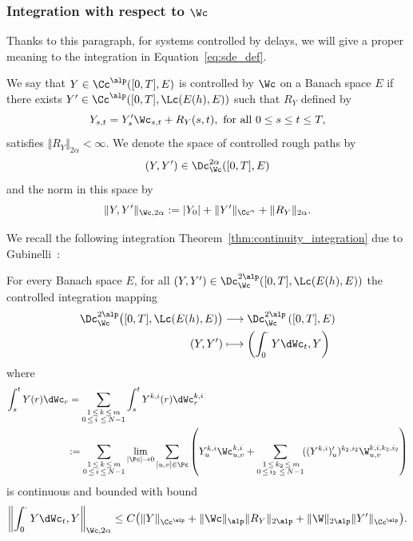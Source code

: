 \subsubsection{Integration with respect to \texorpdfstring{$\Wc$}{W}}
Thanks to this paragraph, for systems controlled by delays, we will give a proper meaning to the integration in Equation~\eqref{eq:sde_def}.

\begin{defi}\label{def-controlled}
We say that $Y\in \Cc^\alp ([0,T], E)$ is controlled by $\Wc$ on a Banach space $E$ if there exists $Y'\in \Cc^\alp ([0,T], \Lc(E(h),E))$ such that $R_Y$ defined by
\begin{equation}\label{controlled}
Y_{s,t}= Y'_s \Wc_{s,t} + R_Y(s,t),\text{ for all }0\leq s\leq t\leq T,
\end{equation}
satisfies $\Vert R_Y \Vert_{2\alpha}<\infty$. We denote the space of controlled rough paths by
\[
(Y,Y')\in \Dc_\Wc^{2\alpha} ([0,T], E)
\]
and the norm in this space by
\[
\Vert Y,Y'\Vert_{\Wc,2\alpha}:=|Y_0|+\Vert Y'\Vert_{\Cc^\alpha}+ \Vert R_Y\Vert_{2\alpha}.
\]
\end{defi}

We recall the following integration Theorem~\ref{thm:continuity_integration} due to Gubinelli~\cite[Theorem~4.10]{FH14}:
\begin{theo}\label{thm:continuity_integration}
For every Banach space $E$, for all $(Y,Y')\in \Dc_{\Wc}^{2\alp} ([0,T], \Lc(E(h),\linebreak E))$ the controlled integration mapping
\begin{align*}
\Dc_{\Wc}^{2\alp} \big([0,T], \Lc(E(h),E) \big)  &\longrightarrow\Dc_{\Wc}^{2\alp} \left([0,T], E \right)\\
(Y,Y')&\longmapsto\left(\int_0^\cdot Y\dWc_t,Y\right)
\end{align*}
where
\begin{align*}
\int_s^t Y(r) \dWc_r &=\sum_{ \substack{1\,\leq\,k\,\leq\,m \\
0\,\leq\,i\,\,\leq\,N-1}}
\int_s^t Y^{k,i}(r) \dWc^{k,i}_r
\\
&\!:= \sum_{ \substack{1\,\leq\,k\,\leq\,m\\
0\,\leq\,i\,\leq\,N-1}}
\lim_{|\Pc|\to 0}\sum_{[u,v]\in\Pc}\left(Y^{k,i}_u \Wc_{u,v}^{k,i}+\sum_{\substack{\,1\,\leq\,k_2\,\leq\,m \\
0\,\leq\,i_2\,\,\leq\,N-1}}\! ((Y^{k,i})'_u)^{k_2,i_2} \W_{u,v}^{k,i,k_2,i_2}\right)
\end{align*}
is continuous and bounded with bound
\[
\left\lVert \int_0^\cdot Y\dWc_t,Y \right\rVert_{\Wc,2\alpha}
\leq C\big(\Vert Y\Vert_{\Cc^\alp} + \Vert \Wc\Vert_\alp\Vert R_Y\Vert_{2\alp}+\Vert \W\Vert_{2\alp} \Vert Y'\Vert_{\Cc^\alp}
\big) .
\]
\end{theo}

